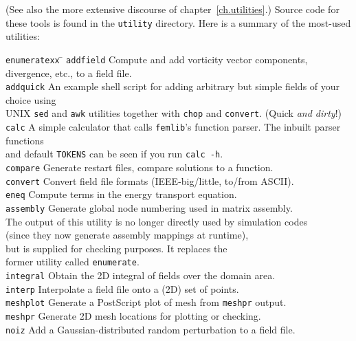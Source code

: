 \documentclass[11pt]{report}
\begin{document}
(See also the more extensive discourse of chapter~\ref{ch.utilities}.)
Source code for these tools is found in the \texttt{utility}
directory.  Here is a summary of the most-used utilities:
\begin{tabbing}
\texttt{enumeratexx}  \= \kill
\texttt{addfield} \> 
        Compute and add vorticity vector components, divergence, etc., to
        a field file.\\
\texttt{addquick} \> 
        An example shell script for adding arbitrary but simple fields
        of your choice using\\
        \> UNIX \verb|sed| and \verb|awk| utilities together with
        \verb|chop| and \verb|convert|. (Quick \emph{and dirty}!)\\
\texttt{calc} \>      
        A simple calculator that calls \verb+femlib+'s function
        parser. The inbuilt parser functions\\ \>and default \texttt{TOKENS}
        can be seen if you run \texttt{calc -h}.\\
\texttt{compare} \>   
        Generate restart files, compare solutions to a function.\\
\texttt{convert} \>   
        Convert field file formats (IEEE-big/little, to/from ASCII).\\
\texttt{eneq} \>   
        Compute terms in the energy transport equation.\\
\texttt{assembly}  \>
        Generate global node numbering used in matrix assembly.  \\
        \> The output of this utility is no longer directly used by
        simulation codes \\ 
        \> (since they now generate assembly mappings at runtime), \\
        \> but is supplied for checking purposes.  It replaces the \\
        \> former utility called \verb+enumerate+.\\
\texttt{integral} \>
        Obtain the 2D integral of fields over the
        domain area.\\
\texttt{interp} \>   
       Interpolate a field file onto a (2D) set of points.\\
\texttt{meshplot} \>
        Generate a PostScript plot of mesh from \texttt{meshpr} output.\\
\texttt{meshpr} \>    
        Generate 2D mesh locations for plotting or checking.\\
\texttt{noiz} \>      
        Add a Gaussian-distributed random perturbation to a field file.\\

\end{tabbing}
\end{document}
